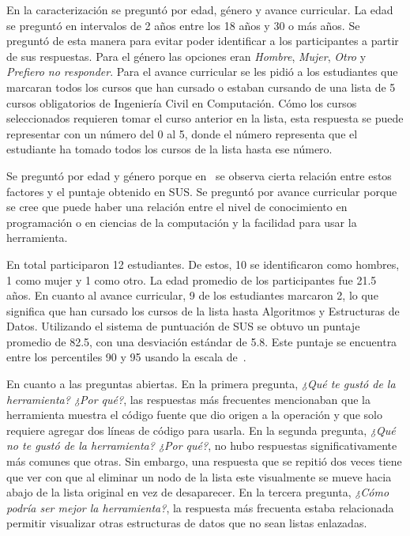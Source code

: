 En la caracterización se preguntó por edad, género y avance curricular. La edad se preguntó en intervalos de 2 años entre los 18 años y 30 o más años. Se preguntó de esta manera para evitar poder identificar a los participantes a partir de sus respuestas. Para el género las opciones eran \textit{Hombre}, \textit{Mujer}, \textit{Otro} y \textit{Prefiero no responder}. Para el avance curricular se les pidió a los estudiantes que marcaran todos los cursos que han cursado o estaban cursando de una lista de 5 cursos obligatorios de Ingeniería Civil en Computación. Cómo los cursos seleccionados requieren tomar el curso anterior en la lista, esta respuesta se puede representar con un número del 0 al 5, donde el número representa que el estudiante ha tomado todos los cursos de la lista hasta ese número.

Se preguntó por edad y género porque en~\cite{evaluation-of-sus} se observa cierta relación entre estos factores y el puntaje obtenido en SUS. Se preguntó por avance curricular porque se cree que puede haber una relación entre el nivel de conocimiento en programación o en ciencias de la computación y la facilidad para usar la herramienta.

En total participaron 12 estudiantes. De estos, 10 se identificaron como hombres, 1 como mujer y 1 como otro. La edad promedio de los participantes fue 21.5 años. En cuanto al avance curricular, 9 de los estudiantes marcaron 2, lo que significa que han cursado los cursos de la lista hasta Algoritmos y Estructuras de Datos. Utilizando el sistema de puntuación de SUS se obtuvo un puntaje promedio de 82.5, con una desviación estándar de 5.8. Este puntaje se encuentra entre los percentiles 90 y 95 usando la escala de~\cite{quantifying-the-user-experience}.

En cuanto a las preguntas abiertas. En la primera pregunta, \textit{¿Qué te gustó de la herramienta? ¿Por qué?}, las respuestas más frecuentes mencionaban que la herramienta muestra el código fuente que dio origen a la operación y que solo requiere agregar dos líneas de código para usarla. En la segunda pregunta, \textit{¿Qué no te gustó de la herramienta? ¿Por qué?}, no hubo respuestas significativamente más comunes que otras. Sin embargo, una respuesta que se repitió dos veces tiene que ver con que al eliminar un nodo de la lista este visualmente se mueve hacia abajo de la lista original en vez de desaparecer. En la tercera pregunta, \textit{¿Cómo podría ser mejor la herramienta?}, la respuesta más frecuenta estaba relacionada permitir visualizar otras estructuras de datos que no sean listas enlazadas.


